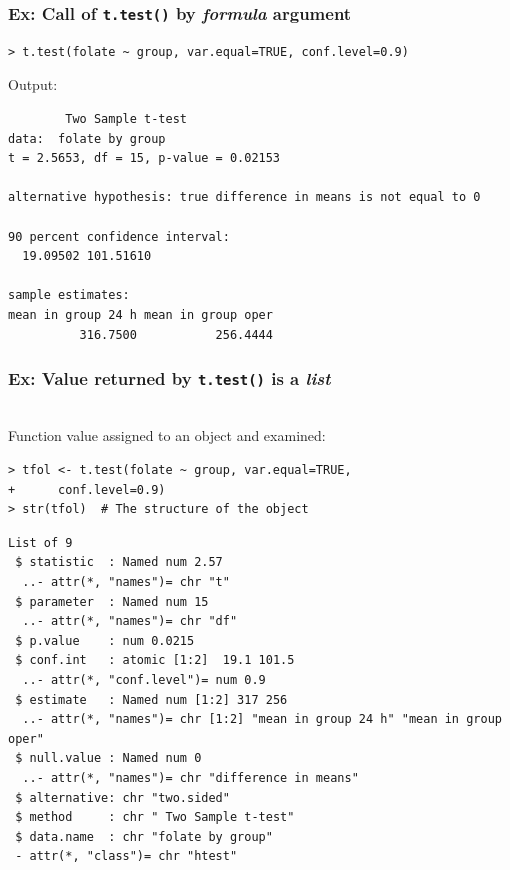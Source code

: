 \documentclass[handout,12pt]{beamer}
\begin{document}
\begin{frame}[fragile]
\frametitle{Ex: Call of {\tt t.test()} by \emph{formula} argument}

\small
\begin{verbatim}
> t.test(folate ~ group, var.equal=TRUE, conf.level=0.9)
\end{verbatim}
\normalsize
Output:
\scriptsize 
\begin{verbatim}
        Two Sample t-test
data:  folate by group 
t = 2.5653, df = 15, p-value = 0.02153

alternative hypothesis: true difference in means is not equal to 0 

90 percent confidence interval:
  19.09502 101.51610 
  
sample estimates:
mean in group 24 h mean in group oper 
          316.7500           256.4444 
\end{verbatim}

\normalsize
\end{frame} 



\begin{frame}[fragile]
\frametitle{Ex: Value returned by {\tt t.test()} is a \emph{list}}

\ \\
Function value assigned to an object and examined:
\small
\begin{verbatim}
> tfol <- t.test(folate ~ group, var.equal=TRUE, 
+      conf.level=0.9) 
> str(tfol)  # The structure of the object
\end{verbatim}
\normalsize
{\scriptsize
\begin{verbatim}
List of 9
 $ statistic  : Named num 2.57
  ..- attr(*, "names")= chr "t"
 $ parameter  : Named num 15
  ..- attr(*, "names")= chr "df"
 $ p.value    : num 0.0215
 $ conf.int   : atomic [1:2]  19.1 101.5
  ..- attr(*, "conf.level")= num 0.9
 $ estimate   : Named num [1:2] 317 256
  ..- attr(*, "names")= chr [1:2] "mean in group 24 h" "mean in group oper"
 $ null.value : Named num 0
  ..- attr(*, "names")= chr "difference in means"
 $ alternative: chr "two.sided"
 $ method     : chr " Two Sample t-test"
 $ data.name  : chr "folate by group"
 - attr(*, "class")= chr "htest"
\end{verbatim}

}

\end{frame} 
\end{document}
